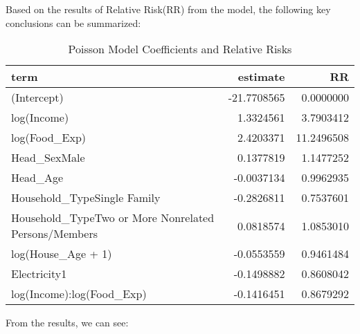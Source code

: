 \documentclass[
]{article}
\begin{document}
Based on the results of Relative Risk(RR) from the model, the following
key conclusions can be summarized:

\begin{table}
\centering
\caption{Poisson Model Coefficients and Relative Risks}
\centering
\begin{tabular}[t]{l|r|r}
\hline
term & estimate & RR\\
\hline
(Intercept) & -21.7708565 & 0.0000000\\
\hline
log(Income) & 1.3324561 & 3.7903412\\
\hline
log(Food\_Exp) & 2.4203371 & 11.2496508\\
\hline
Head\_SexMale & 0.1377819 & 1.1477252\\
\hline
Head\_Age & -0.0037134 & 0.9962935\\
\hline
Household\_TypeSingle Family & -0.2826811 & 0.7537601\\
\hline
Household\_TypeTwo or More Nonrelated Persons/Members & 0.0818574 & 1.0853010\\
\hline
log(House\_Age + 1) & -0.0553559 & 0.9461484\\
\hline
Electricity1 & -0.1498882 & 0.8608042\\
\hline
log(Income):log(Food\_Exp) & -0.1416451 & 0.8679292\\
\hline
\end{tabular}
\end{table}

From the results, we can see:
\end{document}
